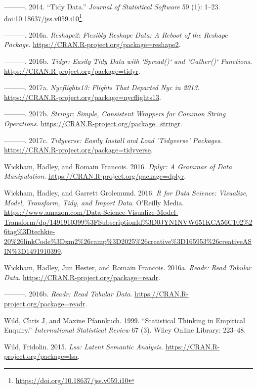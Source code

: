 \documentclass[12pt,]{book}
\renewcommand{\href}[2]{#2\footnote{\url{#1}}}
\begin{document}
\hypertarget{ref-tidydata}{}
---------. 2014. ``Tidy Data.'' \emph{Journal of Statistical Software}
59 (1): 1--23.
doi:\href{https://doi.org/10.18637/jss.v059.i10}{10.18637/jss.v059.i10}.

\hypertarget{ref-R-reshape2}{}
---------. 2016a. \emph{Reshape2: Flexibly Reshape Data: A Reboot of the
Reshape Package}. \url{https://CRAN.R-project.org/package=reshape2}.

\hypertarget{ref-R-tidyr}{}
---------. 2016b. \emph{Tidyr: Easily Tidy Data with `Spread()` and
`Gather()` Functions}. \url{https://CRAN.R-project.org/package=tidyr}.

\hypertarget{ref-R-nycflights13}{}
---------. 2017a. \emph{Nycflights13: Flights That Departed Nyc in
2013}. \url{https://CRAN.R-project.org/package=nycflights13}.

\hypertarget{ref-R-stringr}{}
---------. 2017b. \emph{Stringr: Simple, Consistent Wrappers for Common
String Operations}. \url{https://CRAN.R-project.org/package=stringr}.

\hypertarget{ref-R-tidyverse}{}
---------. 2017c. \emph{Tidyverse: Easily Install and Load 'Tidyverse'
Packages}. \url{https://CRAN.R-project.org/package=tidyverse}.

\hypertarget{ref-R-dplyr}{}
Wickham, Hadley, and Romain Francois. 2016. \emph{Dplyr: A Grammar of
Data Manipulation}. \url{https://CRAN.R-project.org/package=dplyr}.

\hypertarget{ref-r4ds}{}
Wickham, Hadley, and Garrett Grolemund. 2016. \emph{R for Data Science:
Visualize, Model, Transform, Tidy, and Import Data}. O'Reilly Media.
\url{https://www.amazon.com/Data-Science-Visualize-Model-Transform/dp/1491910399\%3FSubscriptionId\%3D0JYN1NVW651KCA56C102\%26tag\%3Dtechkie-20\%26linkCode\%3Dxm2\%26camp\%3D2025\%26creative\%3D165953\%26creativeASIN\%3D1491910399}.

\hypertarget{ref-readr}{}
Wickham, Hadley, Jim Hester, and Romain Francois. 2016a. \emph{Readr:
Read Tabular Data}. \url{https://CRAN.R-project.org/package=readr}.

\hypertarget{ref-R-readr}{}
---------. 2016b. \emph{Readr: Read Tabular Data}.
\url{https://CRAN.R-project.org/package=readr}.

\hypertarget{ref-wild1999statistical}{}
Wild, Chris J, and Maxine Pfannkuch. 1999. ``Statistical Thinking in
Empirical Enquiry.'' \emph{International Statistical Review} 67 (3).
Wiley Online Library: 223--48.

\hypertarget{ref-R-lsa}{}
Wild, Fridolin. 2015. \emph{Lsa: Latent Semantic Analysis}.
\url{https://CRAN.R-project.org/package=lsa}.
\end{document}
